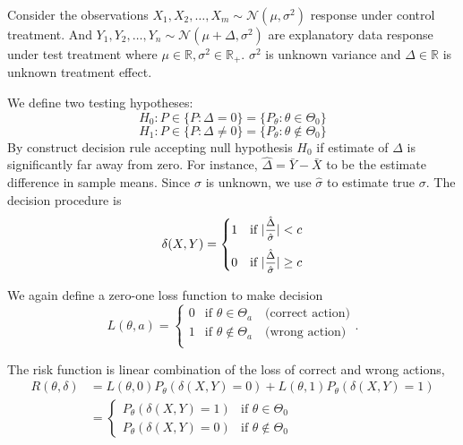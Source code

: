 \begin{example}
    Consider the observations $X_1, X_2, \ldots, X_m \sim \mathcal{N}(\mu, \sigma^2)$ response 
    under control treatment. And $Y_1, Y_2, \ldots, Y_n \sim \mathcal{N}(\mu + \Delta, \sigma^2)$
    are explanatory data response under test treatment where $\mu \in \mathbb{R}, \sigma^2 \in \mathbb{R}_+$.
    $\sigma^2$ is unknown variance and $\Delta \in \mathbb{R}$ is unknown treatment effect.

    We define two testing hypotheses:
    \[
        H_0 : P \in \{ P : \Delta = 0 \} = \{ P_\theta : \theta \in \Theta_0 \}
    \]
    \[
        H_1 : P \in \{ P : \Delta \neq 0 \} = \{ P_\theta : \theta \notin \Theta_0 \}
    \]
    By construct decision rule accepting null hypothesis $H_0$ if estimate of $\Delta$ 
    is significantly far away from zero. For instance, $\hat{\Delta} = \bar{Y} - \bar{X}$ to be 
    the estimate difference in sample means. Since $\sigma$ is unknown, we use $\hat{\sigma}$ to estimate 
    true $\sigma$. The decision procedure is 
    \[
        \delta(X,Y) = \begin{cases}
            1 & \text{if } |\mfrac{\hat{\Delta}}{\hat{\sigma}}| < c\\[0.8em]
            0 & \text{if } |\mfrac{\hat{\Delta}}{\hat{\sigma}}| \geq c
        \end{cases}
    \]

    We again define a zero-one loss function to make decision 
    \begin{equation*}
        L(\theta, a) = \begin{cases}
            0 & \text{if } \theta \in \Theta_a \quad \text{(correct action)}\\
            1 & \text{if } \theta \notin \Theta_a \quad \text{(wrong action)}\\
        \end{cases}.
    \end{equation*}

    The risk function is linear combination of the loss of correct and wrong actions,
    \begin{align*}
        R(\theta, \delta) &= L(\theta, 0)P_\theta \left(\delta(X,Y) = 0 \right) +
        L(\theta, 1)P_\theta \left(\delta(X,Y) = 1 \right)\\
        &= \begin{cases}
            P_\theta \left(\delta(X,Y) = 1 \right) & \text{if } \theta \in \Theta_0\\
            P_\theta \left(\delta(X,Y) = 0 \right) & \text{if } \theta \notin \Theta_0
        \end{cases}
    \end{align*}
\end{example}

